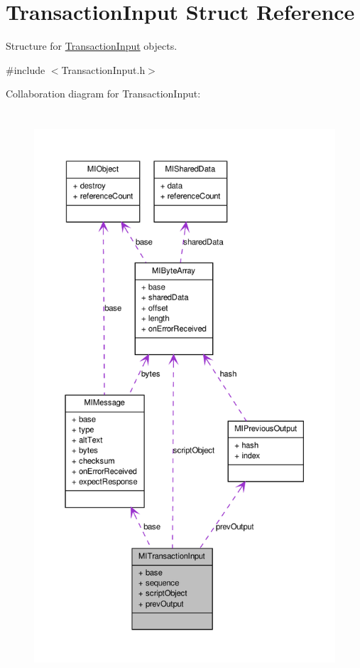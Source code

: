 \hypertarget{struct_m_i_transaction_input}{
\section{TransactionInput Struct Reference}
\label{struct_m_i_transaction_input}
}


Structure for \hyperlink{struct_m_i_transaction_input}{TransactionInput} objects.  




{\ttfamily \#include $<$TransactionInput.h$>$}



Collaboration diagram for TransactionInput:
\nopagebreak
\begin{figure}[H]
\begin{center}
\leavevmode
\includegraphics[height=600pt]{struct_m_i_transaction_input__coll__graph}
\end{center}
\end{figure}
